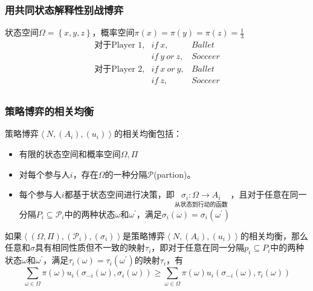 \documentclass{beamer}
\begin{document}
\begin{frame}[label = explain_BoS_using_common_signal]
	\frametitle{用共同状态解释性别战博弈}
	状态空间$\Omega=\left\lbrace x,y,z\right\rbrace $，概率空间$\pi\left(x\right)=\pi\left(y\right)=\pi\left(z\right)=\frac{1}{3}$\\
	\begin{equation*}
		\begin{aligned}
			\text{对于Player 1} ,& if\ x ,& Ballet\\
			& if\ y\ or\ z ,& Socceer\\
			\text{对于Player 2} ,& if\ x\ or\ y ,& Ballet\\
			& if\ z ,& Socceer\\
		\end{aligned}
	\end{equation*}
\end{frame}

\begin{frame}[label = correlated_equilibrium_of_strategic_game]
	\frametitle{策略博弈的相关均衡}
	\begin{definition}[策略博弈的相关均衡]
		\fangsong 
		策略博弈$\left\langle N,\left( A_{i}\right) ,\left( u_{i}\right) \right\rangle $的相关均衡包括：
		\begin{itemize}
			\item[1] 有限的状态空间和概率空间$\Omega,\Pi$
			\item[2] 对每个参与人$i$，存在$\Omega$的一种分隔$\mathcal{P}$(partion)。
			\item[3] 每个参与人$i$都基于状态空间进行决策，即$\underset{\text{从状态到行动的函数}}{ \sigma_{i}:\Omega \to A_{i} }$ ，且对于任意在同一分隔$P_{i}\subseteq \mathcal{P}_{i}$中的两种状态$\omega$和$\omega^{'}$，满足$\sigma_{i}\left(\omega\right)=\sigma_{i}\left(\omega^{'}\right)$
		\end{itemize}
		如果$\left\langle \left(\Omega,\Pi\right),\left(\mathcal{P}_i\right), \left( \sigma_{i} \right) \right\rangle$是策略博弈$\left\langle N,\left( A_{i}\right) ,\left( u_{i}\right) \right\rangle $的相关均衡，那么
		任意和$\sigma$具有相同性质但不一致的映射$\tau_{i}$，即对于任意在同一分隔$p_{i}\subseteq P_{i}$中的两种状态$\omega$和$\omega^{'}$，满足$\tau_{i}\left(\omega\right)=\tau_{i}\left(\omega^{'}\right)$的映射$\tau_{i}$，有
		$$ \sum\limits_{\omega\in\Omega} \pi\left(\omega\right)u_{i}\left(\sigma_{-i}\left(\omega\right),\sigma_{i}\left(\omega\right)\right) \geq \sum\limits_{\omega\in\Omega} \pi\left(\omega\right)u_{i}\left(\sigma_{-i}\left(\omega\right),\tau_{i}\left(\omega\right)\right) $$
	\end{definition}

\end{frame}
\end{document}
